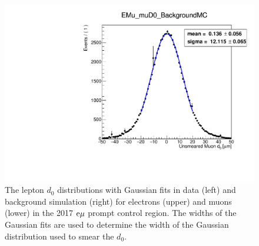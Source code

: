 \begin{figure}[hbtp]
\includegraphics[scale=0.3]{figures/corrections/d0_smearing/emu_2017/gaussian_fit_EMu_muD0_BackgroundMC.pdf}
\caption{The lepton $d_0$ distributions with Gaussian fits in data (left) and background simulation (right) for electrons (upper) and muons (lower) in the 2017 $\mathrm{e}{\mu}$ prompt control region. The widths of the Gaussian fits are used to determine the width of the Gaussian distribution used to smear the $d_0$.}
\label{gaussian_fits_2017}
\end{figure}

